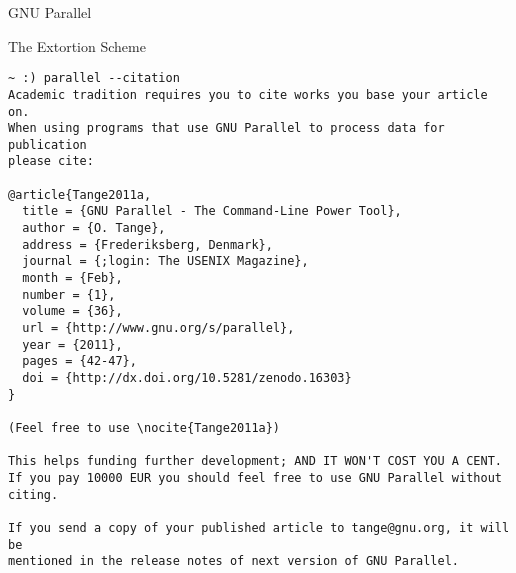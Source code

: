 \documentclass{beamer}
\renewcommand\big[1]{
  \begin{center}
    \Large{#1}
  \end{center}
}
\begin{document}
\begin{frame}
  \centering\Huge{GNU Parallel}
\end{frame}

\begin{frame}[fragile]
    \big{The Extortion Scheme}
\tiny
\begin{verbatim}
~ :) parallel --citation
Academic tradition requires you to cite works you base your article on.
When using programs that use GNU Parallel to process data for publication
please cite:

@article{Tange2011a,
  title = {GNU Parallel - The Command-Line Power Tool},
  author = {O. Tange},
  address = {Frederiksberg, Denmark},
  journal = {;login: The USENIX Magazine},
  month = {Feb},
  number = {1},
  volume = {36},
  url = {http://www.gnu.org/s/parallel},
  year = {2011},
  pages = {42-47},
  doi = {http://dx.doi.org/10.5281/zenodo.16303}
}

(Feel free to use \nocite{Tange2011a})

This helps funding further development; AND IT WON'T COST YOU A CENT.
If you pay 10000 EUR you should feel free to use GNU Parallel without citing.

If you send a copy of your published article to tange@gnu.org, it will be
mentioned in the release notes of next version of GNU Parallel.
\end{verbatim}
\end{frame}
\end{document}

